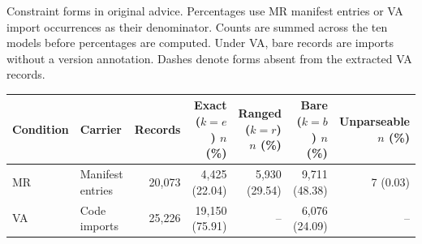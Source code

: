 \begin{tableorg}[!htbp]
\footnotesize
\centering
\caption{Constraint forms in original \myso advice.
Percentages use MR manifest entries or VA import occurrences as their denominator.
Counts are summed across the ten models before percentages are computed.
Under VA, bare records are imports without a version annotation.
Dashes denote forms absent from the extracted VA records.}
\label{tab:rq1_constraint_forms}
\begin{adjustbox}{max width=\textwidth}
\begin{tabular}{llrrrrr}
\toprule
\textbf{Condition} & \textbf{Carrier} & \textbf{Records} & \makecell{\textbf{Exact} ($k=e$)\\$n$ (\%)} & \makecell{\textbf{Ranged} ($k=r$)\\$n$ (\%)} & \makecell{\textbf{Bare} ($k=b$)\\$n$ (\%)} & \makecell{\textbf{Unparseable}\\$n$ (\%)} \\
\midrule
MR & Manifest entries & 20,073 & 4,425 (22.04) & 5,930 (29.54) & 9,711 (48.38) & 7 (0.03) \\
VA & Code imports & 25,226 & 19,150 (75.91) & -- & 6,076 (24.09) & -- \\
\bottomrule
\end{tabular}
\end{adjustbox}
\end{tableorg}
